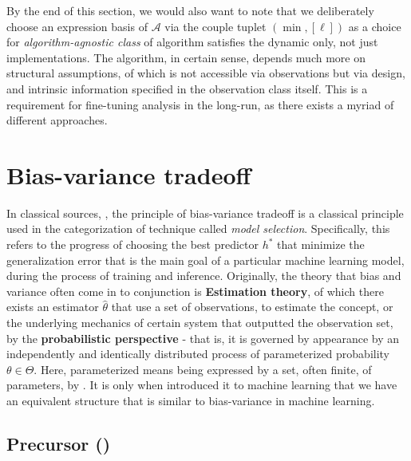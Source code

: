\documentclass[
  journal=largetwo,
  year=2025,
  volume=37,
]{cup-journal}
\begin{document}
By the end of this section, we would also want to note that we deliberately choose an expression basis of $\mathcal{A}$ via the couple tuplet $(\min, [\ell])$ as a choice for \textit{algorithm-agnostic class} of algorithm satisfies the dynamic only, not just implementations. The algorithm, in certain sense, depends much more on structural assumptions, of which is not accessible via observations but via design, and intrinsic information specified in the observation class itself. This is a requirement for fine-tuning analysis in the long-run, as there exists a myriad of different approaches. 


\section{Bias-variance tradeoff}

In classical sources, \cite{James2021,goodfellow2016deep,STL_Hajek_Maxim_2021,10.5555/2371238,10.5555/2621980}, the principle of bias-variance tradeoff is a classical principle used in the categorization of technique called \textit{model selection}. Specifically, this refers to the progress of choosing the best predictor $h^{*}$ that minimize the generalization error that is the main goal of a particular machine learning model, during the process of training and inference. Originally, the theory that bias and variance often come in to conjunction is \textbf{Estimation theory}, of which there exists an estimator $\hat{\theta}$ that use a set of observations, to estimate the concept, or the underlying mechanics of certain system that outputted the observation set, by the \textbf{probabilistic perspective} - that is, it is governed by appearance by an independently and identically distributed process of parameterized probability $\theta\in \Theta$. Here, parameterized means being expressed by a set, often finite, of parameters, by \cite{LehmannCasella_theory_1998,liam_statistics_2005}. It is only when \cite{6797087} introduced it to machine learning that we have an equivalent structure that is similar to bias-variance in machine learning. 

\subsection{Precursor (\cite{6797087})}
\end{document}
